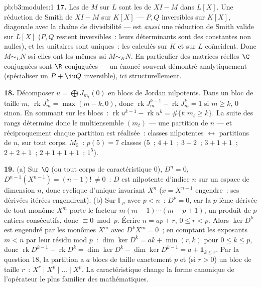 \begin{solution}{pb:b3:modules:1}
\textbf{17.} Les  de $M$ sur $L$ sont
les  de $XI - M$ dans $L[X]$. Une réduction
de Smith de $XI - M$ sur $K[X]$ --- $P, Q$ inversibles sur
$K[X]$, diagonale avec la chaîne de divisibilité --- est
\emph{aussi} une réduction de Smith valide sur $L[X]$ ($P, Q$
restent inversibles~: leurs déterminants sont des constantes
non nulles), et les  unitaires sont
uniques~: les  calculés sur $K$ et sur $L$
coïncident. Donc $M \sim_L N$ ssi elles ont les mêmes  ssi $M \sim_K N$. En particulier des matrices
réelles $\C$-conjuguées sont $\R$-conjuguées --- un énoncé
souvent démontré analytiquement (spécialiser un $P + \iu Q$
inversible), ici structurellement.

\textbf{18.} Décomposer $u = \bigoplus J_{m_t}(0)$ en blocs de
Jordan nilpotents. Dans un bloc de taille $m$,
$\operatorname{rk}J_m^k = \max(m - k, 0)$, donc
$\operatorname{rk}J_m^{k-1} - \operatorname{rk}J_m^k = 1$ si $m
\geq k$, $0$ sinon. En sommant sur les blocs~:
$\operatorname{rk}u^{k-1} - \operatorname{rk}u^k = \#\{t :
m_t \geq k\}$. La suite des rangs détermine donc le
multiensemble $(m_t)$ --- une partition de $n$ --- et
réciproquement chaque partition est réalisée~: classes
nilpotentes $\leftrightarrow$ partitions de $n$, sur tout
corps. $M_5$~: $p(5) = 7$ classes ($5$~; $4{+}1$~; $3{+}2$~;
$3{+}1{+}1$~; $2{+}2{+}1$~; $2{+}1{+}1{+}1$~; $1^5$).

\textbf{19.} (a) Sur $\Q$ (ou tout corps de caractéristique
$0$), $D^n = 0$, $D^{n-1}(X^{n-1}) = (n-1)!\, \neq 0$~: $D$ est
nilpotente d'indice $n$ sur un espace de dimension $n$, donc
cyclique d'unique invariant $X^n$ ($x = X^{n-1}$ engendre~: ses
dérivées itérées engendrent). (b) Sur $\mathbb F_p$ avec $p <
n$~: $D^p = 0$, car la $p$-ième dérivée de tout monôme $X^m$
porte le facteur $m(m-1)\cdots(m-p+1)$, un produit de $p$
entiers consécutifs, donc $\equiv 0 \bmod p$. Écrire $n = ap +
r$, $0 \leq r < p$. Alors $\ker D^k$ est engendré par les
monômes $X^m$ avec $D^kX^m = 0$~; en comptant les exposants $m
< n$ par leur résidu mod $p$~: $\dim\ker D^k = ak + \min(r, k)$
pour $0 \leq k \leq p$, donc $\operatorname{rk}D^{k-1} -
\operatorname{rk}D^k = \dim\ker D^k - \dim\ker D^{k-1} = a +
\mathbf 1_{k \leq r}$. Par la question 18, la partition a $a$
blocs de taille exactement $p$ et (si $r > 0$) un bloc de
taille $r$~:  $X^r \mid X^p \mid \dots
\mid X^p$. La caractéristique change la forme canonique de
l'opérateur le plus familier des mathématiques.


\end{solution}

